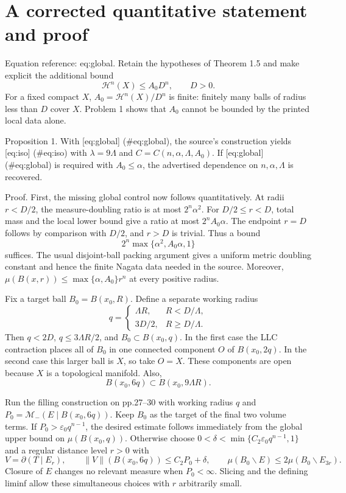 \documentclass[10pt]{article}
\begin{document}
\section*{A corrected quantitative statement and proof}
Equation reference: eq:global. Retain the hypotheses of Theorem 1.5 and make explicit the additional bound \[
 \mathcal H^n(X)\le A_0D^n,\qquad D>0.\] For a fixed compact \(X\), \(A_0=\mathcal H^n(X)/D^n\) is finite: finitely many balls of radius less than \(D\) cover \(X\). Problem 1 shows that \(A_0\) cannot be bounded by the printed local data alone.\par
Proposition 1.  With [eq:global] (\#eq:global), the source’s construction yields [eq:iso] (\#eq:iso) with \(\lambda=9\Lambda\) and \(C=C(n,\alpha,\Lambda,A_0)\). If [eq:global] (\#eq:global) is required with \(A_0\le\alpha\), the advertised dependence on \(n,\alpha,\Lambda\) is recovered.\par
Proof. First, the missing global control now follows quantitatively. At radii \(r<D/2\), the measure-doubling ratio is at most \(2^n\alpha^2\). For \(D/2\le r<D\), total mass and the local lower bound give a ratio at most \(2^nA_0\alpha\). The endpoint \(r=D\) follows by comparison with \(D/2\), and \(r>D\) is trivial. Thus a bound \[2^n\max\{\alpha^2,A_0\alpha,1\}\] suffices. The usual disjoint-ball packing argument gives a uniform metric doubling constant and hence the finite Nagata data needed in the source. Moreover, \(\mu(B(x,r))\le\max\{\alpha,A_0\}r^n\) at every positive radius.\par
Fix a target ball \(B_0=B(x_0,R)\). Define a separate working radius \[q=
 \begin{cases}
   \Lambda R,&R<D/\Lambda,\\
   3D/2,&R\ge D/\Lambda.
 \end{cases}\] Then \(q<2D\), \(q\le3\Lambda R/2\), and \(B_0\subset B(x_0,q)\). In the first case the LLC contraction places all of \(B_0\) in one connected component \(O\) of \(B(x_0,2q)\). In the second case this larger ball is \(X\), so take \(O=X\). These components are open because \(X\) is a topological manifold. Also, \[B(x_0,6q)\subset B(x_0,9\Lambda R).\]\par
Run the filling construction on pp.27–30 with working radius \(q\) and \(P_0=\mathcal M_-(E\mid B(x_0,6q))\). Keep \(B_0\) as the target of the final two volume terms. If \(P_0>\varepsilon_0 q^{n-1}\), the desired estimate follows immediately from the global upper bound on \(\mu(B(x_0,q))\). Otherwise choose \(0<\delta<\min\{C_2\varepsilon_0q^{n-1},1\}\) and a regular distance level \(r>0\) with \[V=\partial(T\mathbin{\vert}E_r),\qquad
 \|V\|(B(x_0,6q))\le C_2P_0+\delta,\qquad
 \mu(B_0\smallsetminus E)\le2\mu(B_0\smallsetminus E_{3r}).\] Closure of \(E\) changes no relevant measure when \(P_0<\infty\). Slicing and the defining liminf allow these simultaneous choices with \(r\) arbitrarily small.\par
\end{document}
